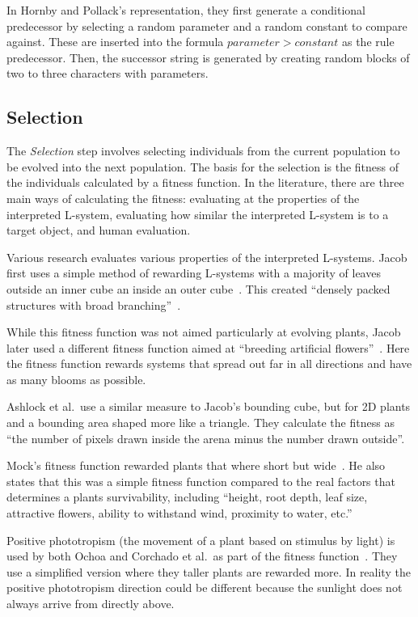 In Hornby and Pollack's representation, they first generate a conditional predecessor by selecting a random parameter and a random constant to compare against.
These are inserted into the formula $parameter > constant$ as the rule predecessor.
Then, the successor string is generated by creating random blocks of two to three characters with parameters.~\cite{2001Hornby}

\subsection{Selection}
The \textit{Selection} step involves selecting individuals from the current population to be evolved into the next population.
The basis for the selection is the fitness of the individuals calculated by a fitness function.
In the literature, there are three main ways of calculating the fitness: evaluating at the properties of the interpreted \gls{L-system}, evaluating how similar the interpreted \gls{L-system} is to a target object, and human evaluation.

Various research evaluates various properties of the interpreted \glspl{L-system}.
Jacob first uses a simple method of rewarding \glspl{L-system} with a majority of leaves outside an inner cube an inside an outer cube~\cite{1994Jacob}.
This created ``densely packed structures with broad branching''~\cite{1994Jacob}.

While this fitness function was not aimed particularly at evolving plants, Jacob later used a different fitness function aimed at ``breeding artificial flowers''~\cite{1994Jacob}.
Here the fitness function rewards systems that spread out far in all directions and have as many blooms as possible.

Ashlock et al.\ use a similar measure to Jacob's bounding cube, but for 2D plants and a bounding area shaped more like a triangle.
They calculate the fitness as ``the number of pixels drawn inside the arena minus the number drawn outside''.
~\cite{2006Ashlock}

Mock's fitness function rewarded plants that where short but wide~\cite{1998Mock}.
He also states that this was a simple fitness function compared to the real factors that determines a plants survivability, including ``height, root depth, leaf size, attractive flowers, ability to withstand wind, proximity to water, etc.''~\cite{1998Mock}

Positive phototropism (the movement of a plant based on stimulus by light) is used by both Ochoa and Corchado et al.\ as part of the fitness function~\cite{1998Ochoa, 2009Corchado}.
They use a simplified version where they taller plants are rewarded more.
In reality the positive phototropism direction could be different because the sunlight does not always arrive from directly above.

